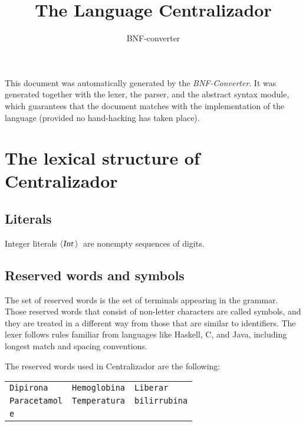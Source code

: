 \documentclass[a4paper,11pt]{article}
\author{BNF-converter}
\title{The Language Centralizador}
\begin{document}
\maketitle

\newcommand{\emptyP}{\mbox{$\epsilon$}}
\newcommand{\terminal}[1]{\mbox{{\texttt {#1}}}}
\newcommand{\nonterminal}[1]{\mbox{$\langle \mbox{{\sl #1 }} \! \rangle$}}
\newcommand{\arrow}{\mbox{::=}}
\newcommand{\delimit}{\mbox{$|$}}
\newcommand{\reserved}[1]{\mbox{{\texttt {#1}}}}
\newcommand{\literal}[1]{\mbox{{\texttt {#1}}}}
\newcommand{\symb}[1]{\mbox{{\texttt {#1}}}}

This document was automatically generated by the {\em BNF-Converter}. It was generated together with the lexer, the parser, and the abstract syntax module, which guarantees that the document matches with the implementation of the language (provided no hand-hacking has taken place).

\section*{The lexical structure of Centralizador}

\subsection*{Literals}
Integer literals \nonterminal{Int}\ are nonempty sequences of digits.




\subsection*{Reserved words and symbols}
The set of reserved words is the set of terminals appearing in the grammar. Those reserved words that consist of non-letter characters are called symbols, and they are treated in a different way from those that are similar to identifiers. The lexer follows rules familiar from languages like Haskell, C, and Java, including longest match and spacing conventions.

The reserved words used in Centralizador are the following: \\

\begin{tabular}{lll}
{\reserved{Dipirona}} &{\reserved{Hemoglobina}} &{\reserved{Liberar}} \\
{\reserved{Paracetamol}} &{\reserved{Temperatura}} &{\reserved{bilirrubina}} \\
{\reserved{e}} & & \\
\end{tabular}\\
\end{document}

